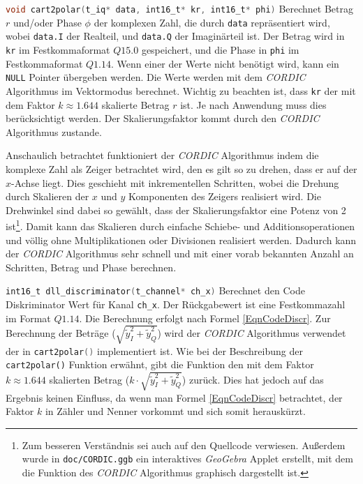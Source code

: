 \lstinline[language=C]$void cart2polar(t_iq* data, int16_t* kr, int16_t* phi)$
Berechnet Betrag $r$ und/oder Phase $\phi$ der komplexen Zahl, die durch \lstinline$data$ repräsentiert wird, wobei \lstinline$data.I$ der Realteil, und \lstinline$data.Q$ der Imaginärteil ist. Der Betrag wird in \lstinline$kr$ im Festkommaformat $Q15.0$ gespeichert, und die Phase in \lstinline$phi$ im Festkommaformat $Q1.14$. Wenn einer der Werte nicht benötigt wird, kann ein \lstinline$NULL$ Pointer übergeben werden. Die Werte werden mit dem \emph{CORDIC} Algorithmus im Vektormodus berechnet. Wichtig zu beachten ist, dass \lstinline$kr$ der mit dem Faktor $k \approx 1.644$ skalierte Betrag $r$ ist. Je nach Anwendung muss dies berücksichtigt werden. Der Skalierungsfaktor kommt durch den \emph{CORDIC} Algorithmus zustande.

Anschaulich betrachtet funktioniert der \emph{CORDIC} Algorithmus indem die komplexe Zahl als Zeiger betrachtet wird, den es gilt so zu drehen, dass er auf der $x$-Achse liegt. Dies geschieht mit inkrementellen Schritten, wobei die Drehung durch Skalieren der $x$ und $y$ Komponenten des Zeigers realisiert wird. Die Drehwinkel sind dabei so gewählt, dass der Skalierungsfaktor eine Potenz von 2 ist\footnote{Zum besseren Verständnis sei auch auf den Quellcode verwiesen. Außerdem wurde in \lstinline$doc/CORDIC.ggb$ ein interaktives \emph{GeoGebra} Applet erstellt, mit dem die Funktion des \emph{CORDIC} Algorithmus graphisch dargestellt ist.}. Damit kann das Skalieren durch einfache Schiebe- und Additionsoperationen und völlig ohne Multiplikationen oder Divisionen realisiert werden. Dadurch kann der \emph{CORDIC} Algorithmus sehr schnell und mit einer vorab bekannten Anzahl an Schritten, Betrag und Phase berechnen.

\lstinline[language=C]$int16_t dll_discriminator(t_channel* ch_x)$ 
Berechnet den Code Diskriminator Wert für Kanal \lstinline[language=C]$ch_x$. Der Rückgabewert ist eine Festkommazahl im Format $Q1.14$. Die Berechnung erfolgt nach Formel \ref{EqnCodeDiscr}. Zur Berechnung der Beträge ($\sqrt{\tilde{y}_{I}^2+\tilde{y}_{Q}^2}$) wird der \emph{CORDIC} Algorithmus verwendet der in \lstinline[language=C]$cart2polar()$ implementiert ist. Wie bei der Beschreibung der \lstinline$cart2polar()$ Funktion erwähnt, gibt die Funktion den mit dem Faktor $k \approx 1.644$ skalierten Betrag ($k\cdot \sqrt{\tilde{y}_{I}^2+\tilde{y}_{Q}^2}$) zurück. Dies hat jedoch auf das Ergebnis keinen Einfluss, da wenn man Formel \ref{EqnCodeDiscr} betrachtet, der Faktor $k$ in Zähler und Nenner vorkommt und sich somit herauskürzt.


